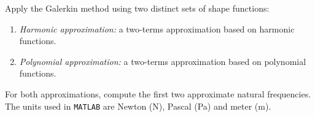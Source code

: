 \documentclass[12pt]{article}
\begin{document}
Apply the Galerkin method using two distinct sets of shape functions:
\begin{enumerate}
    \item \emph{Harmonic approximation:} a two-terms approximation based on harmonic functions.
    \item \emph{Polynomial approximation:} a two-terms approximation based on polynomial functions.
\end{enumerate}
For both approximations, compute the first two approximate natural frequencies. The units used in \texttt{MATLAB} are Newton (N), Pascal (Pa) and meter (m).

\end{document}
